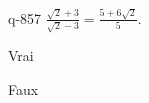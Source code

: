 \begin{truefalse}{q-857}
$\frac{\sqrt 2+3}{\sqrt 2-3} = \frac{5+6\sqrt 2}{5}$.
\item Vrai
\item* Faux
\end{truefalse}

